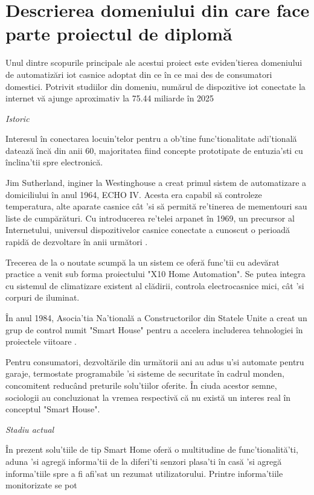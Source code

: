 \section {Descrierea domeniului din care face parte proiectul de diplomă}

Unul dintre scopurile principale ale acestui proiect este eviden'tierea domeniului de automatizări \acrshort{iot} casnice adoptat din ce în ce mai des de consumatori domestici. Potrivit studiilor din domeniu, numărul de dispozitive \acrshort{iot} conectate la internet vă ajunge aproximativ la 75.44 miliarde în 2025 \cite{AlamTanweer2018}

\textit{Istoric}

Interesul în conectarea locuin'telor pentru a ob'tine func'tionalitate adi'tională datează încă din anii 60, majoritatea fiind concepte prototipate de entuzia'sti cu înclina'tii spre electronică.

Jim Sutherland, inginer la Westinghouse a creat primul sistem de automatizare a domiciliului în anul 1964, ECHO IV. Acesta era capabil să controleze temperatura, alte aparate casnice cât 'si să permită re'tinerea de mementouri sau liste de cumpărături. Cu introducerea re'telei \acrfull{arpanet} în 1969, un precursor al Internetului, universul dispozitivelor casnice conectate a cunoscut o perioadă rapidă de dezvoltare în anii următori \cite{ZeusIntegratedSystems}.

Trecerea de la o noutate scumpă la un sistem ce oferă func'tii cu adevărat practice a venit sub forma proiectului "X10 Home Automation". Se putea integra cu sistemul de climatizare existent al clădirii, controla electrocasnice mici, cât 'si corpuri de iluminat.

În anul 1984, Asocia'tia Na'tională a Constructorilor din Statele Unite a creat un grup de control numit "Smart House" pentru a accelera includerea tehnologiei în proiectele viitoare \cite{Aldrich2003Smart}.

Pentru consumatori, dezvoltările din următorii ani au adus u'si automate pentru garaje, termostate programabile 'si sisteme de securitate în cadrul monden, concomitent reducând preturile solu'tiilor oferite. În ciuda acestor semne, sociologii au concluzionat la vremea respectivă că nu există un interes real în conceptul "Smart House".


\textit{Stadiu actual}

În prezent solu'tiile de tip Smart Home oferă o multitudine de func'tionalită'ti, aduna 'si agregă informa'tii de la diferi'ti senzori plasa'ti în casă 'si agregă informa'tiile spre a fi afi'sat un rezumat utilizatorului. Printre informa'tiile monitorizate se pot 

